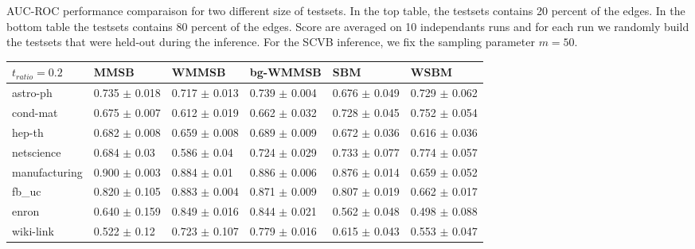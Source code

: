 
\caption{AUC-ROC performance comparaison for two different size of testsets. In the top table, the testsets contains 20 percent of the edges. In the bottom table the testsets contains 80 percent of the edges. Score are averaged on 10 independants runs and for each run we randomly build the testsets that were held-out during the inference. For the SCVB inference, we fix the sampling parameter $m=50$.}

\begin{tabular}{llllll}
\toprule
$t_{ratio}=0.2$             &   MMSB &   WMMSB & bg-WMMSB      &    SBM &   WSBM \\
\midrule

 astro-ph                & 0.735 $\pm$ 0.018   & 0.717 $\pm$ 0.013    & 0.739 $\pm$ 0.004         & 0.676 $\pm$ 0.049 & 0.729 $\pm$ 0.062 \\
 cond-mat                & 0.675 $\pm$ 0.007   & 0.612 $\pm$ 0.019    & 0.662 $\pm$ 0.032         & 0.728 $\pm$ 0.045 & 0.752 $\pm$ 0.054 \\
 hep-th                  & 0.682 $\pm$ 0.008   & 0.659 $\pm$ 0.008    & 0.689 $\pm$ 0.009         & 0.672 $\pm$ 0.036 & 0.616 $\pm$ 0.036 \\
 netscience              & 0.684 $\pm$ 0.03    & 0.586 $\pm$ 0.04     & 0.724 $\pm$ 0.029         & 0.733 $\pm$ 0.077 & 0.774 $\pm$ 0.057 \\
 manufacturing           & 0.900 $\pm$ 0.003   & 0.884 $\pm$ 0.01     & 0.886 $\pm$ 0.006         & 0.876 $\pm$ 0.014 & 0.659 $\pm$ 0.052 \\
 fb\_uc                  & 0.820 $\pm$ 0.105   & 0.883 $\pm$ 0.004    & 0.871 $\pm$ 0.009         & 0.807 $\pm$ 0.019 & 0.662 $\pm$ 0.017 \\
 enron                   & 0.640 $\pm$ 0.159   & 0.849 $\pm$ 0.016    & 0.844 $\pm$ 0.021         & 0.562 $\pm$ 0.048 & 0.498 $\pm$ 0.088 \\
 wiki-link & 0.522 $\pm$ 0.12    & 0.723 $\pm$ 0.107    & 0.779 $\pm$ 0.016         & 0.615 $\pm$ 0.043 & 0.553 $\pm$ 0.047 \\

\bottomrule
\end{tabular}

